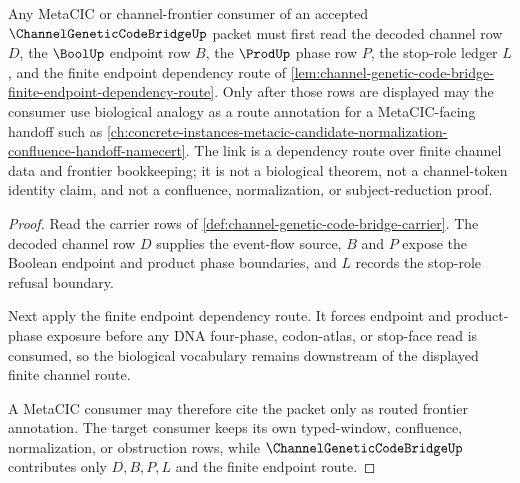 \begin{theorem}
\label{thm:channel-genetic-code-metacic-forward-link}
Any MetaCIC or channel-frontier consumer of an accepted $\ChannelGeneticCodeBridgeUp$ packet must first read the decoded channel row $D$, the $\BoolUp$ endpoint row $B$, the $\ProdUp$ phase row $P$, the stop-role ledger $L$, and the finite endpoint dependency route of \autoref{lem:channel-genetic-code-bridge-finite-endpoint-dependency-route}. Only after those rows are displayed may the consumer use biological analogy as a route annotation for a MetaCIC-facing handoff such as \autoref{ch:concrete-instances-metacic-candidate-normalization-confluence-handoff-namecert}. The link is a dependency route over finite channel data and frontier bookkeeping; it is not a biological theorem, not a channel-token identity claim, and not a confluence, normalization, or subject-reduction proof.
\end{theorem}
\begin{proof}
Read the carrier rows of \autoref{def:channel-genetic-code-bridge-carrier}. The decoded channel row $D$ supplies the event-flow source, $B$ and $P$ expose the Boolean endpoint and product phase boundaries, and $L$ records the stop-role refusal boundary.

Next apply the finite endpoint dependency route. It forces endpoint and product-phase exposure before any DNA four-phase, codon-atlas, or stop-face read is consumed, so the biological vocabulary remains downstream of the displayed finite channel route.

A MetaCIC consumer may therefore cite the packet only as routed frontier annotation. The target consumer keeps its own typed-window, confluence, normalization, or obstruction rows, while $\ChannelGeneticCodeBridgeUp$ contributes only $D,B,P,L$ and the finite endpoint route.
\end{proof}

